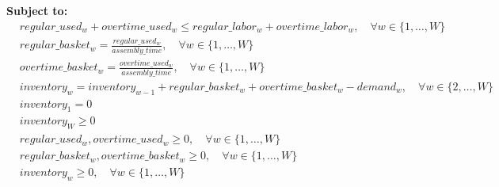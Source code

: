 \documentclass{article}
\begin{document}
\textbf{Subject to:}
\begin{align*}
& regular\_used_{w} + overtime\_used_{w} \leq regular\_labor_{w} + overtime\_labor_{w}, \quad \forall w \in \{1, \ldots, W\} \\
& regular\_basket_{w} = \frac{regular\_used_{w}}{assembly\_time}, \quad \forall w \in \{1, \ldots, W\} \\
& overtime\_basket_{w} = \frac{overtime\_used_{w}}{assembly\_time}, \quad \forall w \in \{1, \ldots, W\} \\
& inventory_{w} = inventory_{w-1} + regular\_basket_{w} + overtime\_basket_{w} - demand_{w}, \quad \forall w \in \{2, \ldots, W\} \\
& inventory_{1} = 0 \\
& inventory_{W} \geq 0 \\
& regular\_used_{w}, overtime\_used_{w} \geq 0, \quad \forall w \in \{1, \ldots, W\} \\
& regular\_basket_{w}, overtime\_basket_{w} \geq 0, \quad \forall w \in \{1, \ldots, W\} \\
& inventory_{w} \geq 0, \quad \forall w \in \{1, \ldots, W\}
\end{align*}
\end{document}

